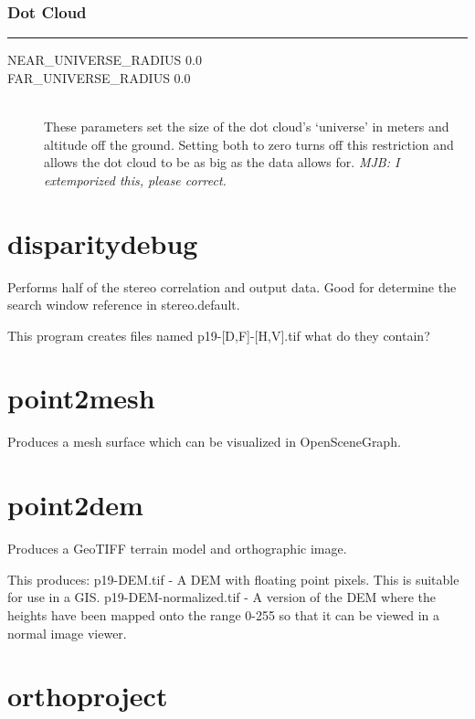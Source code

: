 \subsubsection*{Dot Cloud}
\hrule
\bigskip

\begin{description}
\item[NEAR\_UNIVERSE\_RADIUS 0.0]
\item[FAR\_UNIVERSE\_RADIUS 0.0] \hfill \\
These parameters set the size of the dot cloud's `universe' in meters and altitude off the ground.  Setting both to zero turns off this restriction and allows the dot cloud to be as big as the data allows for. \emph{MJB: I extemporized this, please correct.}

\end{description}

\section{disparitydebug}

Performs half of the stereo correlation and output data. Good for
determine the search window reference in stereo.default.

This program creates files named p19-[D,F]-[H,V].tif what do they contain?

\section{point2mesh}

Produces a mesh surface which can be visualized in OpenSceneGraph.

\section{point2dem}

Produces a GeoTIFF terrain model and orthographic image.

This produces: 
	p19-DEM.tif - A DEM with floating point pixels. This is suitable for use in a GIS.
	p19-DEM-normalized.tif - A version of the DEM where the heights have been mapped onto the range 0-255 so that it can be viewed in a normal image viewer.


\section{orthoproject}
